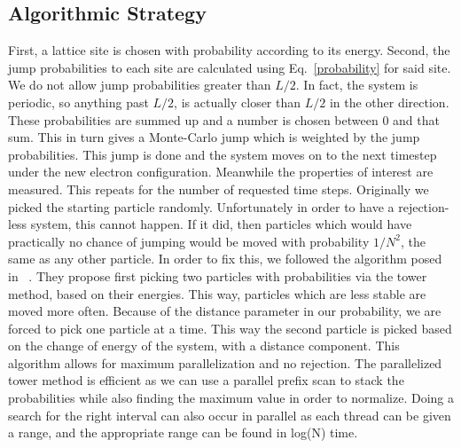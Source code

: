 \subsection{Algorithmic Strategy}
First, a lattice site is chosen with probability according to its energy. Second, the jump probabilities to each site are calculated using Eq.~\ref{probability} for said site. We do not allow jump probabilities greater than $L/2$. In fact, the system is periodic, so anything past $L/2$, is actually closer than $L/2$ in the other direction. These probabilities are summed up and a number is chosen between 0 and that sum. This in turn gives a Monte-Carlo jump which is weighted by the jump probabilities. This jump is done and the system moves on to the next timestep under the new electron configuration. Meanwhile the properties of interest are measured. This repeats for the number of requested time steps. Originally we picked the starting particle randomly. Unfortunately in order to have a rejection-less system, this cannot happen. If it did, then particles which would have practically no chance of jumping would be moved with probability $ 1/N^2$, the same as any other particle. In order to fix this, we followed the algorithm posed in ~\cite{Newman99}. They propose first picking two particles with probabilities via the tower method, based on their energies. This way, particles which are less stable are moved more often. Because of the distance parameter in our probability, we are forced to pick one particle at a time. This way the second particle is picked based on the change of energy of the system, with a distance component. This algorithm allows for maximum parallelization and no rejection. The parallelized tower method is efficient as we can use a parallel prefix scan to stack the probabilities while also finding the maximum value in order to normalize. Doing a search for the right interval can also occur in parallel as each thread can be given a range, and the appropriate range can be found in log(N) time.


